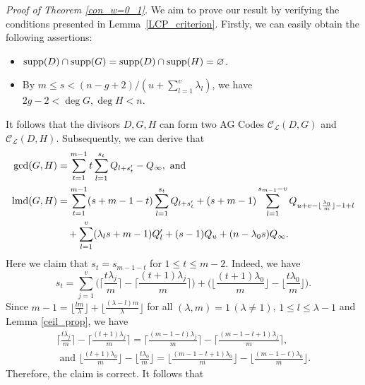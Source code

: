 \documentclass[journal,12pt,onecolumn]{IEEEtran}
\begin{document}
{
\raggedright
{\it Proof of Theorem \ref{con_w=0_1}.} We aim to prove our result by verifying the conditions presented in Lemma~\ref{LCP_criterion}. Firstly, we can easily obtain the following assertions:
}
    \begin{itemize}
        \item ${\rm supp}(D)\cap{\rm supp}(G)={\rm supp}(D)\cap{\rm supp}(H)=\varnothing$.
        \item By $m\le s <(n-g+2)/(u+\sum_{l=1}^v\lambda_l)$, we have $2g-2<\deg G,\deg H< n$. 
    \end{itemize}
    It follows that the divisors $D,G,H$ can form two AG Codes $\mathcal{C}_{\mathcal{L}}(D,G)$ and $\mathcal{C}_{\mathcal{L}}(D,H)$. Subsequently, we can derive that
    \begin{align*}
            \gcd(G,H)&=\sum_{t=1}^{m-1}t\sum_{l=1}^{s_t}Q_{l+s_t^\prime}-Q_\infty, \text{ and }\\
            {\rm lmd}(G,H)&=\sum_{t=1}^{m-1}(s+m-1-t)\sum_{l=1}^{s_t}Q_{l+s_t^\prime} + (s+m-1)\sum_{l=1}^{s_{m-1}-v}Q_{u+v-\lfloor\frac{\lambda_0}{m}\rfloor-1+l}\\ 
            &\quad +\sum_{l=1}^{v}(\lambda_l s+m-1)Q^\prime_l + (s-1)Q_u+(n-\lambda_0s)Q_\infty.
    \end{align*}
    Here we claim that $s_t=s_{m-1-t}$ for $1\le t\le m-2$. Indeed, we have
    \begin{equation}\label{s_t_w=0}
        s_t = \sum_{j=1}^v\bigg(\bigg\lceil\frac{t\lambda_j}{m}\bigg\rceil-\bigg\lceil\frac{(t+1)\lambda_j}{m}\bigg\rceil\bigg)+\bigg(\bigg\lfloor\frac{(t+1)\lambda_0}{m}\bigg\rfloor-\bigg\lfloor\frac{t\lambda_0}{m}\bigg\rfloor\bigg).
    \end{equation}
    Since $m-1=\big\lfloor\frac{l m}{\lambda}\big\rfloor+\big\lfloor\frac{(\lambda-l) m}{\lambda}\big\rfloor$ for all $(\lambda,m)=1\,(\lambda\neq 1)$, $1\le l\le \lambda-1$ and Lemma \ref{ceil_prop}, we have
    \begin{gather*}
        \bigg\lceil\frac{t\lambda_j}{m}\bigg\rceil-\bigg\lceil\frac{(t+1)\lambda_j}{m}\bigg\rceil = \bigg\lceil\frac{(m-1-t)\lambda_j}{m}\bigg\rceil-\bigg\lceil\frac{(m-1-t+1)\lambda_j}{m}\bigg\rceil,\\
        \text{ and }\bigg\lfloor\frac{(t+1)\lambda_0}{m}\bigg\rfloor-\bigg\lfloor\frac{t\lambda_0}{m}\bigg\rfloor = \bigg\lfloor\frac{(m-1-t+1)\lambda_0}{m}\bigg\rfloor-\bigg\lfloor\frac{(m-1-t)\lambda_0}{m}\bigg\rfloor.
    \end{gather*}
    Therefore, the claim is correct. It follows that 
\end{document}
